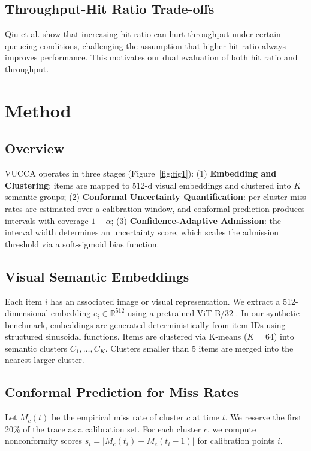 \documentclass[11pt,letterpaper]{article}
\begin{document}
\subsection{Throughput-Hit Ratio Trade-offs}

Qiu et al. \citep{Qiu2024} show that increasing hit ratio can hurt throughput under certain queueing conditions, challenging the assumption that higher hit ratio always improves performance. This motivates our dual evaluation of both hit ratio and throughput.

\section{Method}

\subsection{Overview}

VUCCA operates in three stages (Figure~\ref{fig:fig1}): (1) \textbf{Embedding and Clustering}: items are mapped to 512-d visual embeddings and clustered into $K$ semantic groups; (2) \textbf{Conformal Uncertainty Quantification}: per-cluster miss rates are estimated over a calibration window, and conformal prediction produces intervals with coverage $1-\alpha$; (3) \textbf{Confidence-Adaptive Admission}: the interval width determines an uncertainty score, which scales the admission threshold via a soft-sigmoid bias function.

\subsection{Visual Semantic Embeddings}

Each item $i$ has an associated image or visual representation. We extract a 512-dimensional embedding $e_i \in \mathbb{R}^{512}$ using a pretrained ViT-B/32 \citep{Dosovitskiy2021}. In our synthetic benchmark, embeddings are generated deterministically from item IDs using structured sinusoidal functions. Items are clustered via K-means ($K=64$) into semantic clusters $C_1,\dots,C_K$. Clusters smaller than 5 items are merged into the nearest larger cluster.

\subsection{Conformal Prediction for Miss Rates}

Let $M_c(t)$ be the empirical miss rate of cluster $c$ at time $t$. We reserve the first 20\% of the trace as a calibration set. For each cluster $c$, we compute nonconformity scores $s_i = |M_c(t_i) - M_c(t_i-1)|$ for calibration points $i$.
\end{document}
